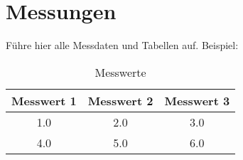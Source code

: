\section{Messungen}
Führe hier alle Messdaten und Tabellen auf. Beispiel:
\begin{table}[h!]
    \centering
    \begin{tabular}{|c|c|c|}
        \hline
        Messwert 1 & Messwert 2 & Messwert 3 \\ \hline
        1.0 & 2.0 & 3.0 \\ \hline
        4.0 & 5.0 & 6.0 \\ \hline
    \end{tabular}
    \caption{Messwerte}
    \label{tab:messwerte}
\end{table}
